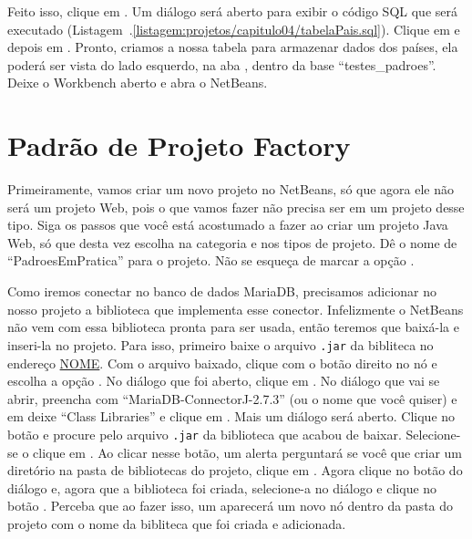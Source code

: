 Feito isso, clique em . Um diálogo será aberto para exibir o código SQL que será executado (Listagem~\thechapter.\ref{listagem:projetos/capitulo04/tabelaPais.sql}). Clique em  e depois em . Pronto, criamos a nossa tabela para armazenar dados dos países, ela poderá ser vista do lado esquerdo, na aba , dentro da base ``testes\_padroes''. Deixe o Workbench aberto e abra o NetBeans. 


\section{Padrão de Projeto Factory}

Primeiramente, vamos criar um novo projeto no NetBeans, só que agora ele não será um projeto Web, pois o que vamos fazer não precisa ser em um projeto desse tipo. Siga os passos que você está acostumado a fazer ao criar um projeto Java Web, só que desta vez escolha  na categoria e  nos tipos de projeto. Dê o nome de ``PadroesEmPratica'' para o projeto. Não se esqueça de marcar a opção .

Como iremos conectar no banco de dados MariaDB, precisamos adicionar no nosso projeto a biblioteca que implementa esse conector. Infelizmente o NetBeans não vem com essa biblioteca pronta para ser usada, então teremos que baixá-la e inseri-la no projeto. Para isso, primeiro baixe o arquivo \texttt{.jar} da bibliteca no endereço \url{NOME}. Com o arquivo baixado, clique com o botão direito no nó  e escolha a opção . No diálogo que foi aberto, clique em . No diálogo que vai se abrir, preencha  com ``MariaDB-ConnectorJ-2.7.3'' (ou o nome que você quiser) e em  deixe ``Class Libraries'' e clique em . Mais um diálogo será aberto. Clique no botão  e procure pelo arquivo \texttt{.jar} da biblioteca que acabou de baixar. Selecione-se o clique em . Ao clicar nesse botão, um alerta perguntará se você que criar um diretório na pasta de bibliotecas do projeto, clique em . Agora clique no botão  do diálogo  e, agora que a biblioteca foi criada, selecione-a no diálogo  e clique no botão . Perceba que ao fazer isso, um aparecerá um novo nó dentro da pasta  do projeto com o nome da bibliteca que foi criada e adicionada.

